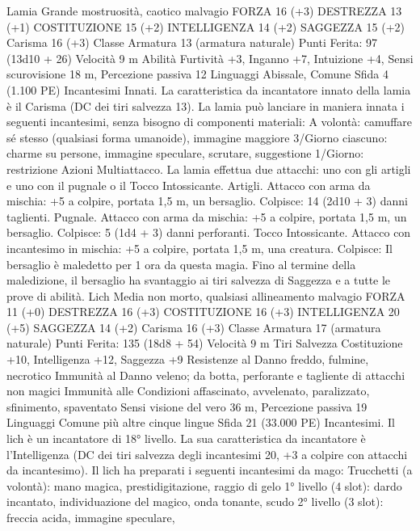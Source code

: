 \begin{multicols}{2}
Lamia
Grande mostruosità, caotico malvagio
FORZA 16 (+3)
DESTREZZA 13 (+1)
COSTITUZIONE 15 (+2)
INTELLIGENZA 14 (+2)
SAGGEZZA 15 (+2)
Carisma 16 (+3)
Classe Armatura 13 (armatura naturale)
\hspace*{0pt}\hfill{Punti Ferita}: 97 (13d10 + 26)
Velocità 9 m
Abilità Furtività +3, Inganno +7, Intuizione +4,
Sensi scurovisione 18 m, Percezione passiva 12
Linguaggi Abissale, Comune
Sfida 4 (1.100 PE)
Incantesimi Innati. La caratteristica da incantatore innato della
lamia è il Carisma (DC dei tiri salvezza 13). La lamia può
lanciare in maniera innata i seguenti incantesimi, senza bisogno
di componenti materiali:
A volontà: camuffare sé stesso (qualsiasi forma umanoide),
immagine maggiore
3/Giorno ciascuno: charme su persone, immagine speculare,
scrutare, suggestione
1/Giorno: restrizione
Azioni
Multiattacco. La lamia effettua due attacchi: uno con gli artigli e
uno con il pugnale o il Tocco Intossicante.
Artigli. Attacco con arma da mischia: +5 a colpire, portata 1,5
m, un bersaglio.
Colpisce: 14 (2d10 + 3) danni taglienti.
Pugnale. Attacco con arma da mischia: +5 a colpire, portata 1,5
m, un bersaglio.
Colpisce: 5 (1d4 + 3) danni perforanti.
Tocco Intossicante. Attacco con incantesimo in mischia: +5 a
colpire, portata 1,5 m, una creatura.
Colpisce: Il bersaglio è maledetto per 1 ora da questa magia.
Fino al termine della maledizione, il bersaglio ha svantaggio ai
tiri salvezza di Saggezza e a tutte le prove di abilità.
Lich
Media non morto, qualsiasi allineamento malvagio
FORZA 11 (+0)
DESTREZZA 16 (+3)
COSTITUZIONE 16 (+3)
INTELLIGENZA 20 (+5)
SAGGEZZA 14 (+2)
Carisma 16 (+3)
Classe Armatura 17 (armatura naturale)
\hspace*{0pt}\hfill{Punti Ferita}: 135 (18d8 + 54)
Velocità 9 m
Tiri Salvezza Costituzione +10, Intelligenza +12, Saggezza +9
Resistenze al Danno freddo, fulmine, necrotico
Immunità al Danno veleno; da botta, perforante e tagliente
di attacchi non magici
Immunità alle Condizioni affascinato, avvelenato, paralizzato,
sfinimento, spaventato
Sensi visione del vero 36 m, Percezione passiva 19
Linguaggi Comune più altre cinque lingue
Sfida 21 (33.000 PE)
Incantesimi. Il lich è un incantatore di 18° livello. La sua
caratteristica da incantatore è l’Intelligenza (DC dei tiri salvezza
degli incantesimi 20, +3 a colpire con attacchi da incantesimo). Il
lich ha preparati i seguenti incantesimi da mago:
Trucchetti (a volontà): mano magica, prestidigitazione, raggio
di gelo
1° livello (4 slot): dardo incantato, individuazione del magico,
onda tonante, scudo
2° livello (3 slot): freccia acida, immagine speculare,

\end{multicols}
